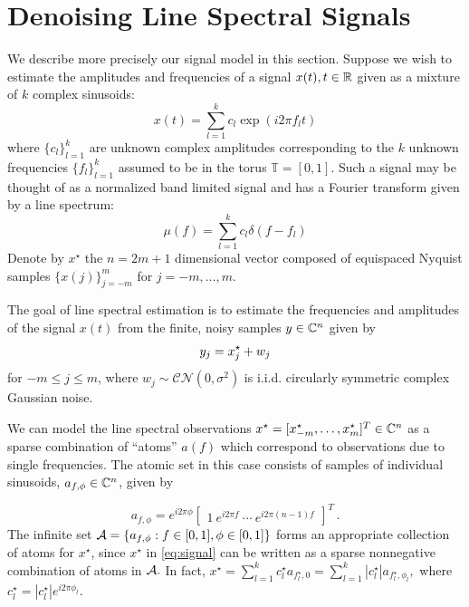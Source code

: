 \section{Denoising Line Spectral Signals}
\label{sec:denoise-trig-moments} 

We describe more precisely our signal model in this section. Suppose we wish to
estimate the amplitudes and frequencies of a signal $x(t), t \in \mathbb{R}$ given as a
mixture of $k$ complex sinusoids:
\begin{equation*}
  x ( t) =  \sum_{l = 1}^k c_l \exp ( i 2 \pi f_l t)
\end{equation*}
where $\{ c_l \}_{l = 1}^k$ are unknown complex amplitudes corresponding to
the $k$ unknown frequencies $\{ f_l \}_{l = 1}^k$ assumed to be in the torus
$\mathbb{T} = [0, 1]$. Such a signal may be thought of as a normalized band
limited signal and has a Fourier transform given by a line spectrum:
\begin{equation}
\label{mu}
\mu(f) = \sum_{l=1}^k c_l\delta(f - f_l)
\end{equation}
Denote by $x^\star$ the $n = 2m+1$ dimensional vector composed of equispaced 
Nyquist samples $\{x(j)\}_{j=-m}^m$   for $j=-m,\ldots,m$.

The goal of line spectral estimation is to estimate the frequencies and 
amplitudes of the signal $x(t)$ from the finite, noisy samples $y \in \mathbb{C}^n$ 
given by
\[
  y_j  =  x_j^\star + w_j\\
\]
for $-m \leq j \leq m$, where $w_j \sim \mathcal{C}\mathcal{N}(0,\sigma^2)$ is 
i.i.d. circularly symmetric complex Gaussian noise. 

We can model the line spectral observations $x^\star = [x_{-m}^\star,
\ldots,x_{m}^\star]^T \in \mathbb{C}^n$ as a sparse combination of ``atoms'' $a(f)$ 
which correspond to observations due to single frequencies. The atomic set in this case consists of samples of individual sinusoids, $a_{f,\phi} \in \mathbb{C}^n$, given by

\begin{equation}
\label{eq:trig-atoms} a_{f,\phi} = e^{i2\pi \phi}\begin{bmatrix}1 ~ e^{i2\pi f} ~
\cdots ~ e^{i2\pi(n-1)f} \end{bmatrix}^T\,.
\end{equation}
The  infinite set $\mathcal{A} = \{ a_{f,\phi}: f \in
[0,1], \phi \in [0,1] \}$ forms an appropriate collection of atoms for
$x^\star$, since $x^\star$ in \eqref{eq:signal} can be written as a sparse
nonnegative combination of atoms in $\mathcal{A}.$ In fact, $x^\star = \sum_{l = 1}^k
c_l^\star a_{f_l^\star,0} = \sum_{l = 1}^k |c_l^\star| a_{f_l^\star,\phi_l},$
where $c_l^\star = |c_l^\star|e^{i2\pi\phi_l}.$

